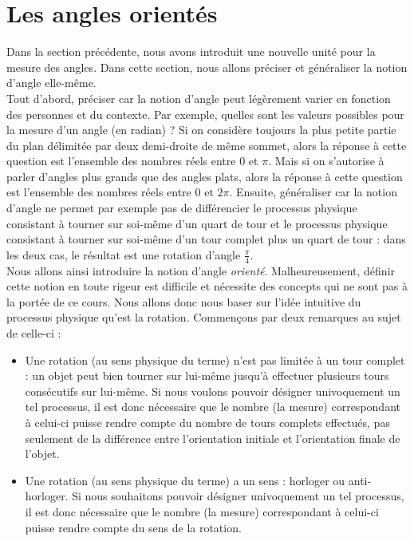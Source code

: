\documentclass[a4paper,fontsize=13pt]{scrreprt}
\theoremstyle{plain}
\theoremstyle{definition}
\begin{document}
\chapter{Les angles orientés}

Dans la section précédente, nous avons introduit une nouvelle unité pour la mesure des angles. Dans cette section, nous allons préciser et généraliser la notion d'angle elle-même. \\
Tout d'abord, préciser car la notion d'angle peut légèrement varier en fonction des personnes et du contexte. Par exemple, quelles sont les valeurs possibles pour la mesure d'un angle (en radian) ? Si on considère toujours la \og plus petite \fg{} partie du plan délimitée par deux demi-droite de même sommet, alors la réponse à cette question est l'ensemble des nombres réels entre $0$ et $\pi$. Mais si on s'autorise à parler d'angles \og plus grands \fg{} que des angles plats, alors la réponse à cette question est l'ensemble des nombres réels entre $0$ et $2\pi$.
Ensuite, généraliser car la notion d'angle ne permet par exemple pas de différencier le processus physique consistant à tourner sur soi-même d'un quart de tour et le processus physique consistant à tourner sur soi-même d'un tour complet plus un quart de tour : dans les deux cas, le résultat est une rotation d'angle $\frac{\pi}{4}$. \\
Nous allons ainsi introduire la notion d'angle \textit{orienté}. Malheureusement, définir cette notion en toute rigeur est difficile et nécessite des concepts qui ne sont pas à la portée de ce cours. Nous allons donc nous baser sur l'idée intuitive du processus physique qu'est la rotation. Commençons par deux remarques au sujet de celle-ci :
\begin{itemize}
\item Une rotation (au sens physique du terme) n'est pas limitée à un tour complet : un objet peut bien tourner sur lui-même jusqu'à effectuer plusieurs tours consécutifs sur lui-même. Si nous voulons pouvoir désigner univoquement un tel processus, il est donc nécessaire que le nombre (la mesure) correspondant à celui-ci puisse rendre compte du nombre de tours complets effectués, pas seulement de la différence entre l'orientation initiale et l'orientation finale de l'objet.
\item Une rotation (au sens physique du terme) a un sens : horloger ou anti-horloger. Si nous souhaitons pouvoir désigner univoquement un tel processus, il est donc nécessaire que le nombre (la mesure) correspondant à celui-ci puisse rendre compte du sens de la rotation.
\end{itemize}
\end{document}
